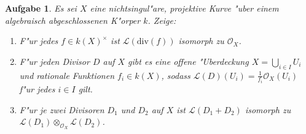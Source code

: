 \documentclass[paper = A4, fontsize=12pt, numbers=noendperiod, chapterprefix=true]{scrbook}
\theoremstyle{break}
\newtheorem{Aufg}{Aufgabe}
\theoremstyle{nonumberbreak}
\theoremstyle{nonumberplain}
\begin{document}
\begin{Aufg}
Es sei $X$ eine nichtsingul"are, projektive Kurve "uber einem algebraisch abgeschlossenen K"orper $k$. Zeige:
\begin{enumerate}%
 \item F"ur jedes $f \in k(X)^\times$ ist $\mathcal{L}(\textrm{div}(f))$ isomorph zu $\mathcal{O}_X$.
 \item F"ur jeden Divisor $D$ auf $X$ gibt es eine offene "Uberdeckung $X = \bigcup_{i \in I} U_i$ %
 und rationale Funktionen $f_i \in k(X)$, sodass $\mathcal{L}(D)(U_i) = \frac{1}{f_i} \mathcal{O}_X(U_i)$ f"ur jedes $i \in I$ gilt.
 \item F"ur je zwei Divisoren $D_1$ und $D_2$ auf $X$ ist $\mathcal{L}(D_1 + D_2)$ isomorph zu $\mathcal{L}(D_1) \otimes_{\mathcal{O}_X} \mathcal{L}(D_2)$.
\end{enumerate}
\end{Aufg}
\end{document}

